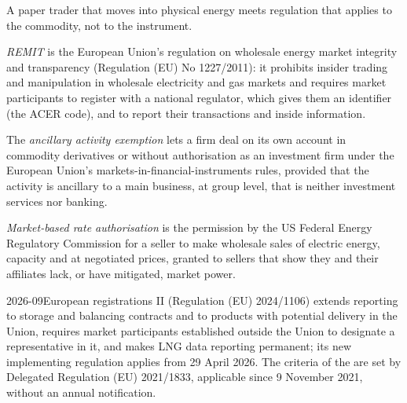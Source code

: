 A paper trader that moves into physical energy meets regulation that applies to the commodity, not to the
instrument.

\begin{definition}[REMIT]\label{def:m3:getting-access-commodities-and-power:remit}
\emph{REMIT} is the European Union's regulation on wholesale energy market integrity and
transparency (Regulation (EU) No 1227/2011): it prohibits insider trading and manipulation in wholesale
electricity and gas markets and requires market participants to register with a national regulator, which
gives them an identifier (the ACER code), and to report their transactions and inside information.
\end{definition}

\begin{definition}\label{def:m3:getting-access-commodities-and-power:aae}
The \emph{ancillary activity exemption} lets a firm deal on its own
account in commodity derivatives or  without authorisation as an investment firm under
the European Union's markets-in-financial-instruments rules, provided that the activity is ancillary to a
main business, at group level, that is neither investment services nor banking.
\end{definition}

\begin{definition}\label{def:m3:getting-access-commodities-and-power:mbr}
\emph{Market-based rate authorisation} is the permission by the US
Federal Energy Regulatory Commission for a seller to make wholesale sales of electric energy, capacity and
 at negotiated prices, granted to sellers that show they and their affiliates lack, or have
mitigated, market power.
\end{definition}

\begin{dated}{2026-09}{European registrations}\label{dat:m3:getting-access-commodities-and-power:remit}
 II (Regulation (EU) 2024/1106) extends reporting to storage and balancing contracts and to products with
potential delivery in the Union, requires market participants established outside the Union to designate a
representative in it, and makes LNG data reporting permanent; its new implementing regulation applies from 29
April 2026. The criteria of the  are set by Delegated Regulation (EU) 2021/1833,
applicable since 9 November 2021, without an annual notification.
\end{dated}

